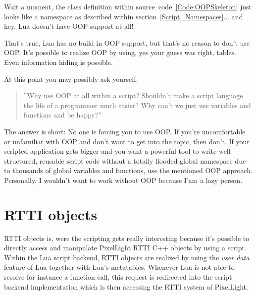 Wait a moment, the class definition within source~code~\ref{Code:OOPSkeleton} just looks like a namespace as described within section~\ref{Script_Namespaces}... and hey, Lua doesn't have OOP support at all!

That's true, Lua has no build in OOP support, but that's no reason to don't use OOP. It's possible to realize OOP by using, yes your guess was right, tables. Even information hiding is possible.

At this point you may possibly ask yourself: \begin{quote}''Why use OOP at all within a script? Shouldn't make a script language the life of a programmer much easier? Why can't we just use variables and functions and be happy?''\end{quote} The answer is short: No one is forcing you to use OOP. If you're uncomfortable or unfamiliar with OOP and don't want to get into the topic, then don't. If your scripted application gets bigger and you want a powerful tool to write well structured, reusable script code without a totally flooded global namespace due to thousands of global variables and functions, use the mentioned OOP approach. Personally, I wouldn't want to work without OOP because I'am a lazy person.




\section{RTTI objects}
\label{Script_RTTIObjects}
RTTI objects is, were the scripting gets really interesting because it's possible to directly access and manipulate PixelLight RTTI C++ objects by using a script. Within the Lua script backend, RTTI objects are realized by using the \emph{user data} feature of Lua together with Lua's metatables. Whenever Lua is not able to resolve for instance a function call, this request is redirected into the script backend implementation which is then accessing the RTTI system of PixelLight.

